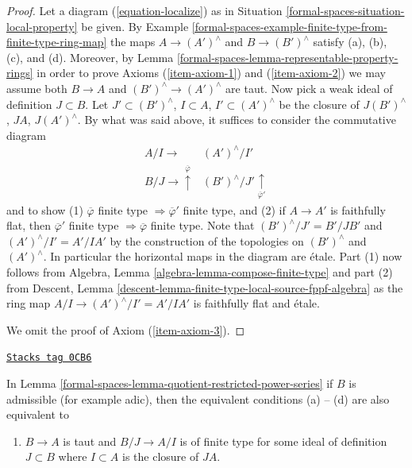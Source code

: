 \begin{proof}
\medskip\noindent
Let a diagram (\ref{equation-localize}) as in
Situation \ref{formal-spaces-situation-local-property}
be given. By Example \ref{formal-spaces-example-finite-type-from-finite-type-ring-map}
the maps $A \to (A')^\wedge$ and $B \to (B')^\wedge$
satisfy (a), (b), (c), and (d). Moreover, by
Lemma \ref{formal-spaces-lemma-representable-property-rings}
in order to prove Axioms (\ref{item-axiom-1}) and (\ref{item-axiom-2})
we may assume both $B \to A$ and $(B')^\wedge \to (A')^\wedge$
are taut. Now pick a weak ideal of definition $J \subset B$. Let
$J' \subset (B')^\wedge$, $I \subset A$, $I' \subset (A')^\wedge$
be the closure of $J(B')^\wedge$, $JA$, $J(A')^\wedge$.
By what was said above, it suffices to consider the commutative
diagram
$$
\begin{array}{cc}A/I \longrightarrow & (A')^\wedge/I' \\ B/J \longrightarrow\overset{\overline{\varphi}}{\uparrow} & (B')^\wedge/J' \underset{\overline{\varphi}'}{\uparrow}\end{array}
$$
and to show (1) $\overline{\varphi}$ finite type
$\Rightarrow \overline{\varphi}'$
finite type, and (2) if $A \to A'$ is faithfully flat, then
$\overline{\varphi}'$ finite type $\Rightarrow \overline{\varphi}$
finite type. Note that $(B')^\wedge/J' = B'/JB'$ and
$(A')^\wedge/I' = A'/IA'$ by the construction of the topologies on
$(B')^\wedge$ and $(A')^\wedge$. In particular the horizontal
maps in the diagram are \'etale. Part (1) now follows from
Algebra, Lemma \ref{algebra-lemma-compose-finite-type}
and part (2) from
Descent, Lemma \ref{descent-lemma-finite-type-local-source-fppf-algebra}
as the ring map $A/I \to (A')^\wedge/I' = A'/IA'$ is faithfully flat
and \'etale.

\medskip\noindent
We omit the proof of Axiom (\ref{item-axiom-3}).
\end{proof}

\begin{lemma}
\label{formal-spaces-lemma-quotient-restricted-power-series-admissible}
\href{https://stacks.math.columbia.edu/tag/0CB6}{\texttt{Stacks tag 0CB6}}

In Lemma \ref{formal-spaces-lemma-quotient-restricted-power-series}
if $B$ is admissible (for example adic), then the equivalent conditions
(a) -- (d) are also equivalent to
\begin{enumerate}
\item[(e)] $B \to A$ is taut and $B/J \to A/I$ is of finite type for
some ideal of definition $J \subset B$ where $I \subset A$ is
the closure of $JA$.
\end{enumerate}
\end{lemma}

